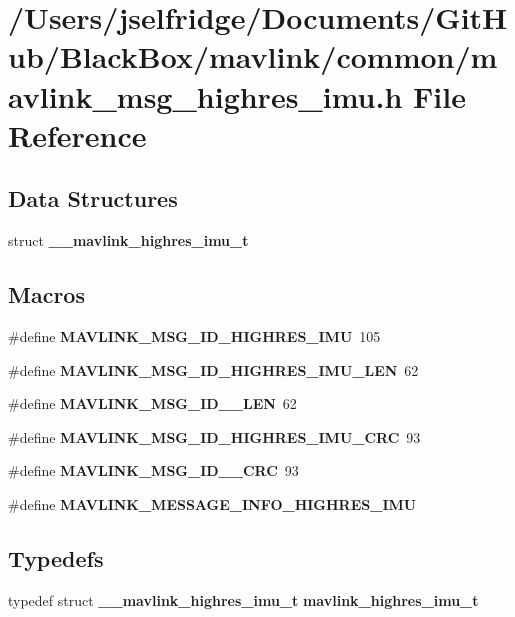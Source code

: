 \section{/\+Users/jselfridge/\+Documents/\+Git\+Hub/\+Black\+Box/mavlink/common/mavlink\+\_\+msg\+\_\+highres\+\_\+imu.h File Reference}
\label{mavlink__msg__highres__imu_8h}
\subsection*{Data Structures}
\begin{DoxyCompactItemize}
\item 
struct \textbf{ \+\_\+\+\_\+mavlink\+\_\+highres\+\_\+imu\+\_\+t}
\end{DoxyCompactItemize}
\subsection*{Macros}
\begin{DoxyCompactItemize}
\item 
\#define \textbf{ M\+A\+V\+L\+I\+N\+K\+\_\+\+M\+S\+G\+\_\+\+I\+D\+\_\+\+H\+I\+G\+H\+R\+E\+S\+\_\+\+I\+MU}~105
\item 
\#define \textbf{ M\+A\+V\+L\+I\+N\+K\+\_\+\+M\+S\+G\+\_\+\+I\+D\+\_\+\+H\+I\+G\+H\+R\+E\+S\+\_\+\+I\+M\+U\+\_\+\+L\+EN}~62
\item 
\#define \textbf{ M\+A\+V\+L\+I\+N\+K\+\_\+\+M\+S\+G\+\_\+\+I\+D\+\_\+\_\+\+L\+EN}~62
\item 
\#define \textbf{ M\+A\+V\+L\+I\+N\+K\+\_\+\+M\+S\+G\+\_\+\+I\+D\+\_\+\+H\+I\+G\+H\+R\+E\+S\+\_\+\+I\+M\+U\+\_\+\+C\+RC}~93
\item 
\#define \textbf{ M\+A\+V\+L\+I\+N\+K\+\_\+\+M\+S\+G\+\_\+\+I\+D\+\_\+\_\+\+C\+RC}~93
\item 
\#define \textbf{ M\+A\+V\+L\+I\+N\+K\+\_\+\+M\+E\+S\+S\+A\+G\+E\+\_\+\+I\+N\+F\+O\+\_\+\+H\+I\+G\+H\+R\+E\+S\+\_\+\+I\+MU}
\end{DoxyCompactItemize}
\subsection*{Typedefs}
\begin{DoxyCompactItemize}
\item 
typedef struct \textbf{ \+\_\+\+\_\+mavlink\+\_\+highres\+\_\+imu\+\_\+t} \textbf{ mavlink\+\_\+highres\+\_\+imu\+\_\+t}
\end{DoxyCompactItemize}



